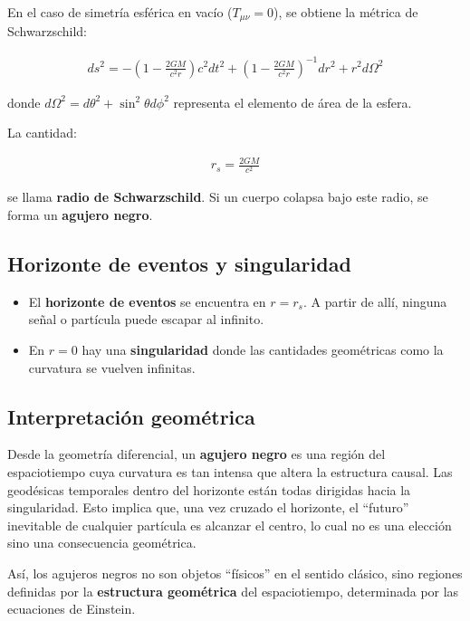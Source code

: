 \documentclass{aleph-revista}
\begin{document}
En el caso de simetría esférica en vacío (\(T_{\mu\nu} = 0\)), se obtiene la métrica de Schwarzschild:

\begin{align*}
ds^2 = -\left(1 - \frac{2GM}{c^2 r} \right)c^2 dt^2 + \left(1 - \frac{2GM}{c^2 r} \right)^{-1} dr^2 + r^2 d\Omega^2
\end{align*}

donde \(d\Omega^2 = d\theta^2 + \sin^2\theta d\phi^2\) representa el elemento de área de la esfera.

La cantidad:

\begin{align*}
r_s = \frac{2GM}{c^2}
\end{align*}

se llama \textbf{radio de Schwarzschild}. Si un cuerpo colapsa bajo este radio, se forma un \textbf{agujero negro}.

\subsection{Horizonte de eventos y singularidad}

\begin{itemize}
  \item El \textbf{horizonte de eventos} se encuentra en \(r = r_s\). A partir de allí, ninguna señal o partícula puede escapar al infinito.
  \item En \(r = 0\) hay una \textbf{singularidad} donde las cantidades geométricas como la curvatura se vuelven infinitas.
\end{itemize}

\subsection{Interpretación geométrica}

Desde la geometría diferencial, un \textbf{agujero negro} es una región del espaciotiempo cuya curvatura es tan intensa que altera la estructura causal. Las geodésicas temporales dentro del horizonte están todas dirigidas hacia la singularidad. Esto implica que, una vez cruzado el horizonte, el “futuro” inevitable de cualquier partícula es alcanzar el centro, lo cual no es una elección sino una consecuencia geométrica.

Así, los agujeros negros no son objetos “físicos” en el sentido clásico, sino regiones definidas por la \textbf{estructura geométrica} del espaciotiempo, determinada por las ecuaciones de Einstein.
\end{document}
